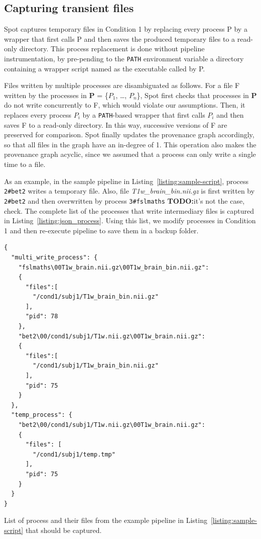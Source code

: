 \documentclass[a4paper,num-refs]{oup-contemporary}
\newcommand{\todo}[1]{\color{red}\textbf{TODO:}#1\color{black}}
\newcommand{\toolname}[0]{Spot\xspace}
\begin{document}
\subsection{Capturing transient files}

\toolname captures temporary files in Condition 1 by replacing every
process P by a wrapper that first calls P and then saves the produced
temporary files to a read-only directory. This process replacement is done
without pipeline instrumentation, by pre-pending to the \texttt{PATH} environment
variable a directory containing a wrapper script named as the executable
called by P.

Files written by multiple processes are disambiguated as follows. For a
 file F written by the processes in \textbf{P} = \{$P_{1}$, \ldots,
 $P_{n}$\}, \toolname first checks that processes in \textbf{P} do not
 write concurrently to F, which would violate our assumptions. Then, it
 replaces every process $P_{i}$ by a \texttt{PATH}-based wrapper that first
 calls $P_{i}$ and then saves F to a read-only directory. In this way,
 successive versions of F are preserved for comparison. \toolname finally
 updates the provenance graph accordingly, so that all files in the graph
 have an in-degree of 1. This operation also makes the provenance graph
 acyclic, since we assumed that a process can only write a single time to a file.

As an example, in the sample pipeline in
Listing~\ref{listing:sample-script}, process \texttt{2\#bet2} writes a
temporary file. Also, file \emph{T1w\_brain\_bin.nii.gz} is first written
by \texttt{2\#bet2} and then overwritten by process \texttt{3\#fslmaths}
\todo{it's not the case, check}. The complete list of the processes that
write intermediary files is captured in Listing~\ref{listing:json_process}.
Using this list, we modify processes in Condition 1 and then re-execute
pipeline to save them in a backup folder. 

\begin{listing}
  \begin{verbatim}
{
  "multi_write_process": {
    "fslmaths\00T1w_brain.nii.gz\00T1w_brain_bin.nii.gz":
    {
      "files":[
        "/cond1/subj1/T1w_brain_bin.nii.gz"
      ],
      "pid": 78
    },
    "bet2\00/cond1/subj1/T1w.nii.gz\00T1w_brain.nii.gz":
    {
      "files":[
        "/cond1/subj1/T1w_brain_bin.nii.gz"
      ],
      "pid": 75
    }
  },
  "temp_process": {
    "bet2\00/cond1/subj1/T1w.nii.gz\00T1w_brain.nii.gz": 
    {
      "files": [
        "/cond1/subj1/temp.tmp"
      ],
      "pid": 75
    } 
  } 
}

\end{verbatim}
\caption{List of process and their files from the example pipeline in 
Listing~\ref{listing:sample-script} that should be captured.}
\label{listing:json_process}
\end{listing}
\end{document}
